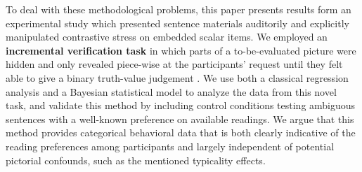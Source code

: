 \documentclass[fleqn,reqno,10pt]{article}
\renewcommand{\mymark}[1]{\textbf{#1}}
\begin{document}

To deal with these methodological problems, this paper presents
results form an experimental study which presented sentence materials
auditorily and explicitly manipulated contrastive stress on embedded
scalar items. We employed an \mymark{incremental verification task} in
which parts of a to-be-evaluated picture were hidden and only revealed
piece-wise at the participants’ request until they felt able to give a
binary truth-value judgement \citep[see][]{Conroy2008}. We use both a
classical regression analysis and a Bayesian statistical model to
analyze the data from this novel task, and validate this method by
including control conditions testing ambiguous sentences with a
well-known preference on available readings. We argue that this method
provides categorical behavioral data that is both clearly indicative
of the reading preferences among participants and largely independent
of potential pictorial confounds, such as the mentioned typicality
effects.
\end{document}
